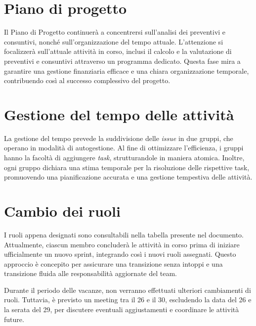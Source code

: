 \section{Piano di progetto}
Il Piano di Progetto continuerà a concentrersi sull'analisi dei preventivi e consuntivi, 
nonché sull'organizzazione del tempo attuale. L'attenzione si focalizzerà sull'attuale attività in corso, 
inclusi il calcolo e la valutazione di preventivi e consuntivi attraverso un programma dedicato. 
Questa fase mira a garantire una gestione finanziaria efficace e una chiara organizzazione temporale, 
contribuendo così al successo complessivo del progetto.


\section{Gestione del tempo delle attività}
La gestione del tempo prevede la suddivisione delle \textit{issue} in due gruppi, che operano in modalità di autogestione. 
Al fine di ottimizzare l'efficienza, i gruppi hanno la facoltà di aggiungere \textit{task}, strutturandole in maniera atomica. 
Inoltre, ogni gruppo dichiara una stima temporale per la risoluzione delle rispettive task, 
promuovendo una pianificazione accurata e una gestione tempestiva delle attività.


\section{Cambio dei ruoli}
I ruoli appena designati sono consultabili nella tabella presente nel documento. 
Attualmente, ciascun membro concluderà le attività in corso prima di iniziare ufficialmente un nuovo sprint, 
integrando così i nuovi ruoli assegnati. Questo approccio è concepito per assicurare una transizione senza intoppi 
e una transizione fluida alle responsabilità aggiornate del team.

Durante il periodo delle vacanze, non verranno effettuati ulteriori cambiamenti di ruoli. 
Tuttavia, è previsto un meeting tra il 26 e il 30, escludendo la data del 26 e la serata del 29, 
per discutere eventuali aggiustamenti e coordinare le attività future.